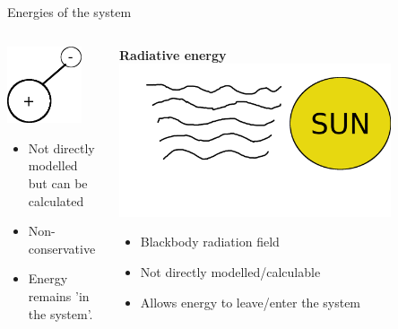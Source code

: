 \documentclass[10pt,aspectratio=169,usenames,dvipsnames]{beamer}
\begin{document}
\begin{frame}{Energies of the system}
\begin{columns}
\begin{column}{0.3\textwidth}
\includegraphics[width=0.8\textwidth]{2023ECRW/Figures/ionenergy.png}
\begin{itemize}
    \item Not directly modelled but can be calculated
    \item Non-conservative 
    \item Energy remains 'in the system'.
\end{itemize}
\end{column}
\begin{column}{0.3\textwidth}
\centering
\textbf{Radiative energy}
\includegraphics[width=0.8\textwidth, trim=0cm 2cm 0cm 0cm,clip]{2023ECRW/Figures/radiationenergy.png}
\begin{itemize}
    \item Blackbody radiation field
    \item Not directly modelled/calculable 
    \item Allows energy to leave/enter the system
\end{itemize}
\end{column}
\end{columns}
\end{frame}
\end{document}
